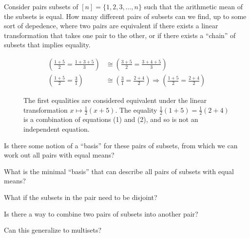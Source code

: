 \documentclass{article}
\begin{document}
Consider pairs subsets of $[n] = \{ 1, 2, 3, \hdots, n \}$ such that the
arithmetic mean of the subsets is equal. How many different pairs of subsets
can we find, up to some sort of depedence, where two pairs are equivalent if
there exists a linear transformation that takes one pair to the other, or
if there exists a ``chain'' of subsets that implies equality.
\begin{figure}[ht!]
  \centering
  \begin{align}
    \left(\frac{1 + 5}{2} = \frac{1 + 3 + 5}{3}\right) &\cong
    \left(\frac{3 + 5}{2} = \frac{3 + 4 + 5}{3}\right)
    \\
    \left(\frac{1 + 5}{2} = \frac{3}{1}\right) &\cong
    \left(\frac{3}{1} = \frac{2 + 4}{2}\right) \Longrightarrow \left(\frac{1 + 5}{2} = \frac{2 + 4}{2}\right)
  \end{align}
  \caption{The first equalities are considered equivalent under the linear
    transformation $x \mapsto \frac{1}{2}(x + 5)$. The equality
    $\frac{1}{2}(1 + 5) = \frac{1}{2}(2 + 4)$ is a combination of
    equations (1) and (2), and so is not an independent equation.}
\end{figure}
\begin{question}
  Is there some notion of a ``basis'' for these pairs of subsets, from which we
  can work out all pairs with equal means?
\end{question}

\begin{related}
  \item What is the minimal ``basis'' that can describe all pairs of subsets with equal means?
  \item What if the subsets in the pair need to be disjoint?
  \item Is there a way to combine two pairs of subsets into another pair?
  \item Can this generalize to multisets?
\end{related}
\end{document}
